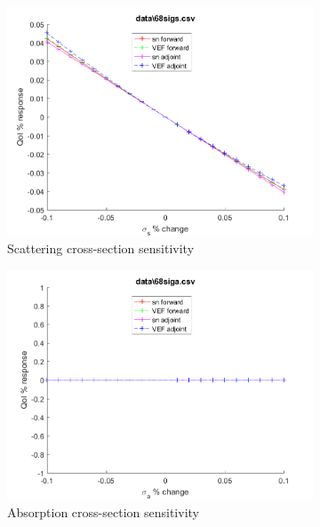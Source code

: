 \documentclass{article}
\begin{document}
\begin{figure}[H]
\begin{subfigure}{.5\textwidth}
  \includegraphics[width=.98\linewidth]{IanProposal/figures2/68sigsSens.png}
  \caption{Scattering cross-section sensitivity}
  \label{fig:sfig2}
\end{subfigure}%
\begin{subfigure}{.5\textwidth}
  \centering
  \includegraphics[width=.98\linewidth]{IanProposal/figures2/68sigaSens.png}
  \caption{Absorption cross-section sensitivity}
  \label{fig:sfig5}
\end{subfigure}%
\caption{}
\label{fig:fig}
\end{figure}
\newpage

\end{document}
